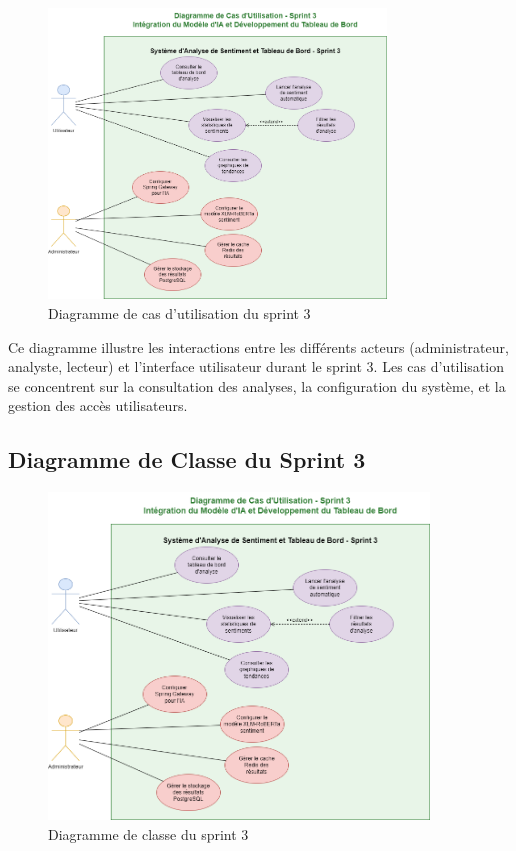 \begin{figure}[H]
\centering
\includegraphics[width=0.8\textwidth]{assets/images/sprint3-usecase.png}
\caption{Diagramme de cas d'utilisation du sprint 3}
\label{fig:sprint3-usecase}
\end{figure}

Ce diagramme illustre les interactions entre les différents acteurs (administrateur, analyste, lecteur) et l'interface utilisateur durant le sprint 3. Les cas d'utilisation se concentrent sur la consultation des analyses, la configuration du système, et la gestion des accès utilisateurs.

\subsection{Diagramme de Classe du Sprint 3}

\begin{figure}[H]
\centering
\includegraphics[width=0.9\textwidth]{assets/images/sprint3-usecase.png}
\caption{Diagramme de classe du sprint 3}
\label{fig:sprint3-class}
\end{figure}

